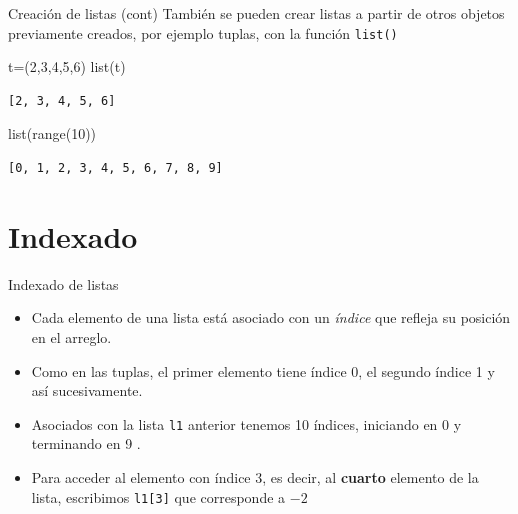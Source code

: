 \documentclass[
  ignorenonframetext,
  aspectratio=169,
  spanish,
]{beamer}
\newenvironment{Shaded}{\begin{snugshade}}{\end{snugshade}}
\newcommand{\BuiltInTok}[1]{\textcolor[rgb]{0.00,0.23,0.31}{#1}}
\newcommand{\DecValTok}[1]{\textcolor[rgb]{0.68,0.00,0.00}{#1}}
\newcommand{\NormalTok}[1]{\textcolor[rgb]{0.00,0.23,0.31}{#1}}
\newcommand{\OperatorTok}[1]{\textcolor[rgb]{0.37,0.37,0.37}{#1}}
\providecommand{\tightlist}{%
  \setlength{\itemsep}{0pt}\setlength{\parskip}{0pt}}
\begin{document}
\begin{frame}[fragile]{Creación de listas (cont)}
\label{creaciuxf3n-de-listas-cont}
También se pueden crear listas a partir de otros objetos previamente
creados, por ejemplo tuplas, con la función \texttt{list()}
 

\begin{Shaded}
\begin{Highlighting}[]
\NormalTok{t}\OperatorTok{=}\NormalTok{(}\DecValTok{2}\NormalTok{,}\DecValTok{3}\NormalTok{,}\DecValTok{4}\NormalTok{,}\DecValTok{5}\NormalTok{,}\DecValTok{6}\NormalTok{) }
\BuiltInTok{list}\NormalTok{(t)  }
\end{Highlighting}
\end{Shaded}

\begin{verbatim}
[2, 3, 4, 5, 6]
\end{verbatim}

\begin{Shaded}
\begin{Highlighting}[]
\BuiltInTok{list}\NormalTok{(}\BuiltInTok{range}\NormalTok{(}\DecValTok{10}\NormalTok{)) }
\end{Highlighting}
\end{Shaded}

\begin{verbatim}
[0, 1, 2, 3, 4, 5, 6, 7, 8, 9]
\end{verbatim}
\end{frame}

\section{Indexado}\label{indexado}

\begin{frame}[fragile]{Indexado de listas}
\label{sec-IndexadoDeListas}

\begin{itemize}
\tightlist
\item
  Cada elemento de una lista está asociado con un \emph{índice} que
  refleja su posición en el arreglo.
\item
  Como en las tuplas, el primer elemento tiene índice 0, el segundo
  índice 1 y así sucesivamente.
\item
  Asociados con la lista \texttt{l1} anterior tenemos 10 índices,
  iniciando en 0 y terminando en 9 .
\item
  Para acceder al elemento con índice 3, es decir, al \textbf{cuarto}
  elemento de la lista, escribimos \texttt{l1{[}3{]}} que corresponde a
  \(-2\)
\end{itemize}
\end{frame}
\end{document}

